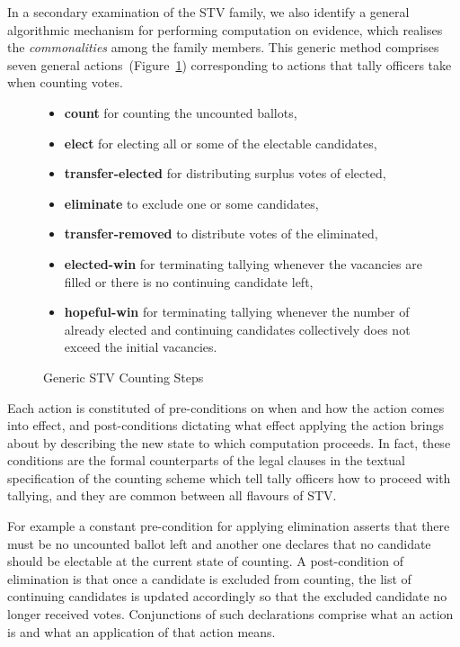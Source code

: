 \documentclass[10pt,conference]{IEEEtran}
\begin{document}
In a secondary examination of the STV family, we also identify a general algorithmic mechanism for performing computation on evidence, which realises the \emph{commonalities} among the family members. This generic method comprises seven general actions~(Figure~\ref{GenSteps}) corresponding to actions that tally officers take when counting votes.
\begin{figure} 
 \begin{itemize}
\item\textbf{count} for counting the uncounted ballots,
\item\textbf{elect} for electing all or some of the electable candidates, 
\item\textbf{transfer-elected} for distributing surplus votes of elected, %
\item\textbf{eliminate} to exclude one or some candidates, 
\item\textbf{transfer-removed} to distribute votes of   the eliminated, %
\item\textbf{elected-win} for terminating tallying whenever the vacancies are filled or there is no continuing candidate left, 
\item\textbf{hopeful-win} for terminating tallying whenever  the number of already elected and continuing candidates collectively does not exceed the initial vacancies. 
\end{itemize}
\caption{Generic STV Counting Steps}
\label{GenSteps}
\end{figure}
Each action is constituted of  pre-conditions on when and how the action comes into effect, and post-conditions dictating what effect applying the action brings about by describing the new state to which computation proceeds. In fact, these conditions are the formal counterparts of the legal clauses in the textual specification of the counting scheme which tell tally officers how to proceed with tallying, and they are common between all flavours of STV. 

For example a constant pre-condition for applying elimination  asserts that there must be no uncounted ballot left and another one declares that no candidate should be electable at the current state of counting. A post-condition of elimination is that once a candidate is excluded from counting, the list of continuing candidates is updated accordingly so that the excluded candidate no longer received votes. Conjunctions of such declarations comprise what an action is and what an application of that action means.
\end{document}
